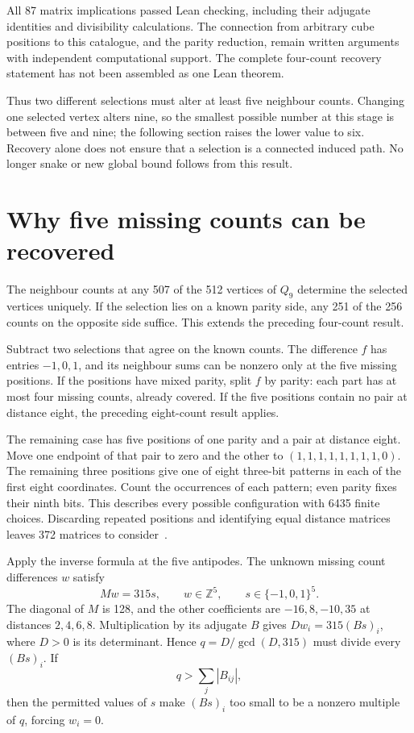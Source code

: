 \documentclass[11pt,a4paper]{article}
\begin{document}
All 87 matrix implications passed Lean checking, including their
adjugate identities and divisibility calculations. The connection from
arbitrary cube positions to this catalogue, and the parity reduction,
remain written arguments with independent computational support. The
complete four-count recovery statement has not been assembled as one
Lean theorem.

Thus two different selections must alter at least five neighbour
counts. Changing one selected vertex alters nine, so the smallest
possible number at this stage is between five and nine; the following
section raises the lower value to six. Recovery alone does
not ensure that a selection is a connected induced path. No longer
snake or new global bound follows from this result.

\section{Why five missing counts can be recovered}
The neighbour counts at any 507 of the 512 vertices of $Q_9$ determine
the selected vertices uniquely. If the selection lies on a known
parity side, any 251 of the 256 counts on the opposite side suffice.
This extends the preceding four-count result.

Subtract two selections that agree on the known counts. The difference
$f$ has entries $-1,0,1$, and its neighbour sums can be nonzero only
at the five missing positions. If the positions have mixed parity,
split $f$ by parity: each part has at most four missing counts, already
covered. If the five positions contain no pair at distance eight,
the preceding eight-count result applies.

The remaining case has five positions of one parity and a pair at
distance eight. Move one endpoint of that pair to zero and the other
to $(1,1,1,1,1,1,1,1,0)$. The remaining three positions give one of eight
three-bit patterns in each of the first eight coordinates. Count the
occurrences of each pattern; even parity fixes their ninth bits.
This describes every possible configuration with 6435 finite choices.
Discarding repeated positions and identifying equal distance matrices
leaves 372 matrices to consider~\cite{research240}.

Apply the inverse formula at the five antipodes. The unknown missing
count differences $w$ satisfy
\[
Mw=315s,\qquad w\in\mathbb Z^5,\qquad s\in\{-1,0,1\}^5.
\]
The diagonal of $M$ is 128, and the other coefficients are
$-16,8,-10,35$ at distances $2,4,6,8$. Multiplication by its adjugate
$B$ gives $Dw_i=315(Bs)_i$, where $D>0$ is its determinant. Hence
$q=D/\gcd(D,315)$ must divide every $(Bs)_i$. If
\[
q>\sum_j|B_{ij}|,
\]
then the permitted values of $s$ make $(Bs)_i$ too small to be a nonzero
multiple of $q$, forcing $w_i=0$.
\end{document}
